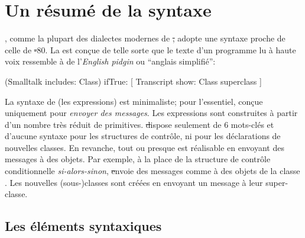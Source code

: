 \documentclass[a4paper,10pt,twoside]{book}
\begin{document}
	\renewcommand{\nnbb}[2]{} %
	\sloppy
\fi
\chapter{Un résumé de la syntaxe}



\pharo, comme la plupart des dialectes modernes de \st, adopte une syntaxe proche de celle de \st-80.
La  est conçue de telle sorte que le texte d'un
programme lu à haute voix ressemble à de l'\emph{English pidgin} ou ``anglais simplifié'':

\begin{code}{}
(Smalltalk includes: Class) ifTrue: [ Transcript show: Class superclass ]
\end{code}

\noindent
La syntaxe de \pharo (\ie les expressions) est minimaliste; pour l'essentiel, conçue uniquement pour \emph{envoyer des messages}.
Les expressions sont construites à partir d'un nombre très réduit de primitives.
\st dispose seulement de 6 mots-clés et d'aucune syntaxe pour les structures de contrôle, ni pour les déclarations de nouvelles classes.
En revanche, tout ou presque est réalisable en envoyant des messages à des objets.
Par exemple, à la place de la structure de contrôle conditionnelle \emph{si-alors-sinon}, \st envoie des messages comme  à des objets de la classe .
Les nouvelles \mbox{(sous-)classes} sont créées en envoyant un message à leur super-classe.

\section{Les éléments syntaxiques }
\end{document}
